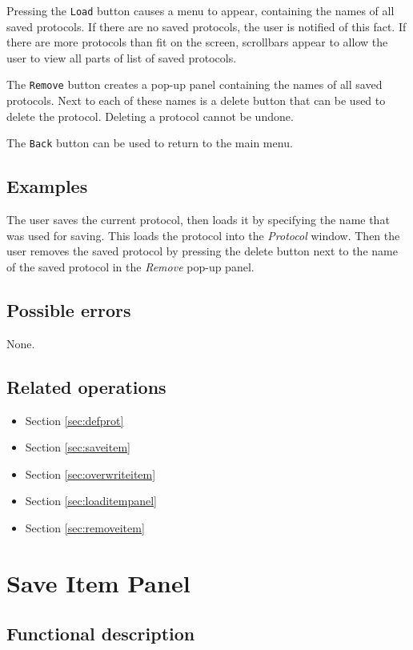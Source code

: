   Pressing the \texttt{Load} button causes a menu to appear, containing the names of all saved protocols. If there are no saved protocols, the user is notified of this fact. If there are more protocols than fit on the screen, scrollbars appear to allow the user to view all parts of list of saved protocols.
  
  The \texttt{Remove} button creates a pop-up panel containing the names of all saved protocols. Next to each of these names is a delete button that can be used to delete the protocol. Deleting a protocol cannot be undone.
  
  The \texttt{Back} button can be used to return to the main menu.
  
  \subsection*{Examples}
  The user saves the current protocol, then loads it by specifying the name that was used for saving. This loads the protocol into the \emph{Protocol} window. Then the user removes the saved protocol by pressing the delete button next to the name of the saved protocol in the \emph{Remove} pop-up panel.

  \subsection*{Possible errors}
  None.
  
  \subsection*{Related operations}
  \begin{itemize}
    \item Section \ref{sec:defprot}
    \item Section \ref{sec:saveitem}
    \item Section \ref{sec:overwriteitem}
    \item Section \ref{sec:loaditempanel}
    \item Section \ref{sec:removeitem}
  \end{itemize}
  
\section{Save Item Panel}
  \subsection*{Functional description}

